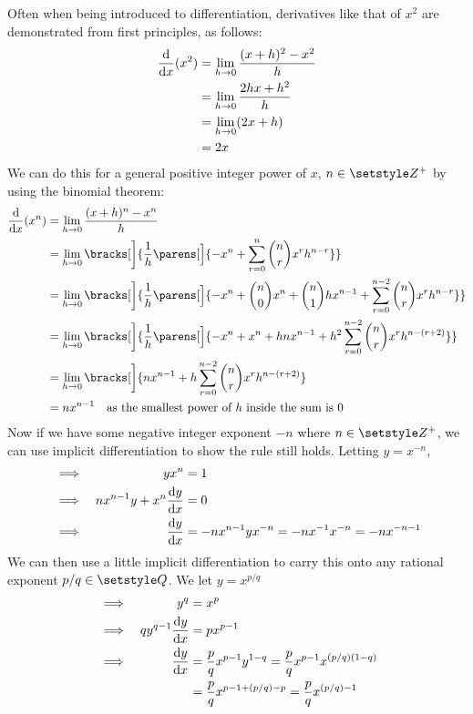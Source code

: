 Often when being introduced to differentiation, derivatives like that of
\(x^2\) are demonstrated from first principles, as follows:
\begin{align*}
    \dv{x}(x^2) &= \lim_{h \to 0} \frac{(x + h)^2 - x^2} h \\
                  &= \lim_{h \to 0} \frac{2hx + h^2} h \\
                  &= \lim_{h \to 0} (2x + h) \\
                  &= 2x
\end{align*}
We can do this for a general positive integer power of \(x\),
\(n \in \Integers^+\) by using the binomial theorem:
\begin{align*}
    \dv{x}(x^n) &= \lim_{h \to 0} \frac{(x + h)^n - x^n} h \\
                  &= \lim_{h \to 0} \bracks[\bigg]{\frac 1h \parens[\Big]{-x^n
                          + \sum_{r = 0}^n \binom nr x^r h^{n - r}}} \\
                  &= \lim_{h \to 0} \bracks[\bigg]{\frac 1h \parens[\Big]{
                          -x^n + \binom n0 x^n + \binom n1 hx^{n - 1}
                          + \sum_{r = 0}^{n - 2}
                  \binom nr x^r h^{n - r}}} \\
              &= \lim_{h \to 0} \bracks[\bigg]{\frac 1h \parens[\Big]{-x^n + x^n
                          + hnx^{n - 1} + h^2 \sum_{r = 0}^{n - 2}
                  \binom nr x^r h^{n - (r + 2)}}} \\
                  &= \lim_{h \to 0} \bracks[\bigg]{nx^{n - 1} + h \sum_{r = 0}^{n - 2}
                  \binom nr x^r h^{n - (r + 2)}} \\
                  &= nx^{n-1}\quad
                  \text{as the smallest power of \(h\) inside the sum is 0}
\end{align*}
Now if we have some negative integer exponent \(-n\) where
\(n \in \Integers^+\), we can use implicit differentiation to show the rule
still holds. Letting \(y = x^{-n}\),
\begin{alignat*}{2}
&\implies& yx^n &= 1 \\
&\implies& nx^{n - 1}y + x^n \dv<y>{x} &= 0 \\
&\implies& \dv<y>{x} &= -nx^{n - 1}yx^{-n}
    = -nx^{-1}x^{-n} = -nx^{-n - 1}
\end{alignat*}
We can then use a little implicit differentiation to carry this onto any
rational exponent \(p / q \in \Rationals\). We let \(y = x^{p / q}\)
\begin{alignat*}{2}
&\implies& y^q &= x^p \\
&\implies& qy^{q - 1}\dv<y>{x} &= px^{p - 1} \\
&\implies& \dv<y>{x} &= \frac pq x^{p - 1}y^{1 - q}
    = \frac pq x^{p - 1}x^{(p / q)(1 - q)} \\
&&  &= \frac pq x^{p - 1 + (p / q) - p}
    = \frac pq x^{(p / q) - 1}
\end{alignat*}

